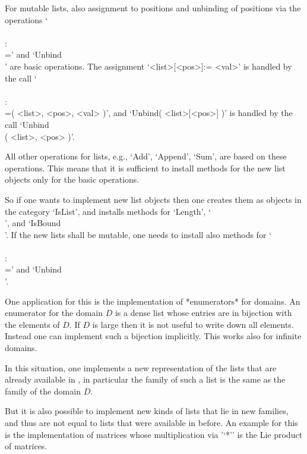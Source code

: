 For mutable lists, also assignment to positions and unbinding of
positions via the operations `\\[\\]\\:\\=' and `Unbind\\[\\]'
are basic operations.
The assignment `<list>[<pos>]:= <val>' is handled by the call
`\\[\\]\\:\\=( <list>, <pos>, <val> )',
and `Unbind( <list>[<pos>] )' is handled by the call
`Unbind\\[\\]( <list>, <pos> )'.

All other operations for lists, e.g., `Add', `Append', `Sum',
are based on these operations.
This means that it is sufficient to install methods for the new list
objects only for the basic operations.

So if one wants to implement new list objects then one creates them
as objects in the category `IsList', and installs methods for `Length',
`\\[\\]', and `IsBound\\[\\]'.
If the new lists shall be mutable, one needs to install also methods
for `\\[\\]\\:\\=' and `Unbind\\[\\]'.

One application for this is the implementation of *enumerators*
for domains.
An enumerator for the domain $D$ is a dense list whose entries are
in bijection with the elements of $D$.
If $D$ is large then it is not useful to write down all elements.
Instead one can implement such a bijection implicitly.
This works also for infinite domains.

In this situation, one implements a new representation of the
lists that are already available in {\GAP},
in particular the family of such a list is the same as the family of
the domain $D$.

But it is also possible to implement new kinds of lists that lie in
new families, and thus are not equal to lists that were available
in {\GAP} before.
An example for this is the implementation of matrices
whose multiplication via '`*'' is the Lie product of matrices.

